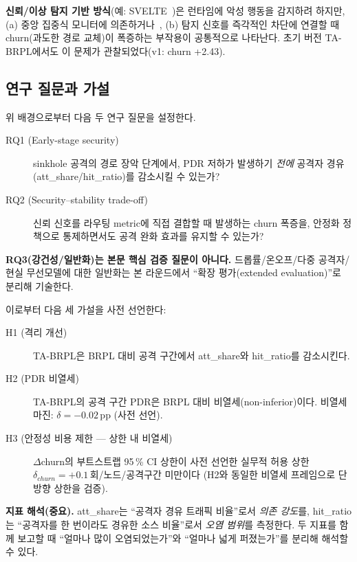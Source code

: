 \documentclass[12pt,a4paper]{article}
\begin{document}
\textbf{신뢰/이상 탐지 기반 방식}(예: SVELTE~\cite{raza2013})은 런타임에
악성 행동을 감지하려 하지만,
(a) 중앙 집중식 모니터에 의존하거나~\cite{iotroute_survey2016},
(b) 탐지 신호를 즉각적인 차단에 연결할 때
churn(과도한 경로 교체)이 폭증하는 부작용이 공통적으로 나타난다.
초기 버전 TA-BRPL에서도 이 문제가 관찰되었다(v1: churn +2.43).

\subsection{연구 질문과 가설}
\label{sec:rq}

위 배경으로부터 다음 두 연구 질문을 설정한다.

\begin{description}
  \item[RQ1 (Early-stage security)]
    sinkhole 공격의 경로 장악 단계에서,
    PDR 저하가 발생하기 \emph{전에}
    공격자 경유(att\_share/hit\_ratio)를 감소시킬 수 있는가?

  \item[RQ2 (Security–stability trade-off)]
    신뢰 신호를 라우팅 metric에 직접 결합할 때 발생하는
    churn 폭증을, 안정화 정책으로 통제하면서도
    공격 완화 효과를 유지할 수 있는가?
\end{description}

\noindent\textbf{RQ3(강건성/일반화)는 본문 핵심 검증 질문이 아니다.}
드롭률/온오프/다중 공격자/현실 무선모델에 대한 일반화는
본 라운드에서 ``확장 평가(extended evaluation)''로 분리해 기술한다.

이로부터 다음 세 가설을 사전 선언한다:

\begin{description}
  \item[H1 (격리 개선)]
    TA-BRPL은 BRPL 대비 공격 구간에서
    att\_share와 hit\_ratio를 감소시킨다.

  \item[H2 (PDR 비열세)]
    TA-BRPL의 공격 구간 PDR은 BRPL 대비 비열세(non-inferior)이다.
    비열세 마진: $\delta = -0.02$\,pp (사전 선언).

  \item[H3 (안정성 비용 제한 — 상한 내 비열세)]
    $\Delta$churn의 부트스트랩 95\,\% CI 상한이
    사전 선언한 실무적 허용 상한
    $\delta_{churn} = +0.1$\,회/노드/공격구간 미만이다
    (H2와 동일한 비열세 프레임으로 단방향 상한을 검증).
\end{description}

\noindent\textbf{지표 해석(중요).}
att\_share는 ``공격자 경유 트래픽 비율''로서 \emph{의존 강도}를,
hit\_ratio는 ``공격자를 한 번이라도 경유한 소스 비율''로서
\emph{오염 범위}를 측정한다.
두 지표를 함께 보고할 때 ``얼마나 많이 오염되었는가''와
``얼마나 넓게 퍼졌는가''를 분리해 해석할 수 있다.
\end{document}

